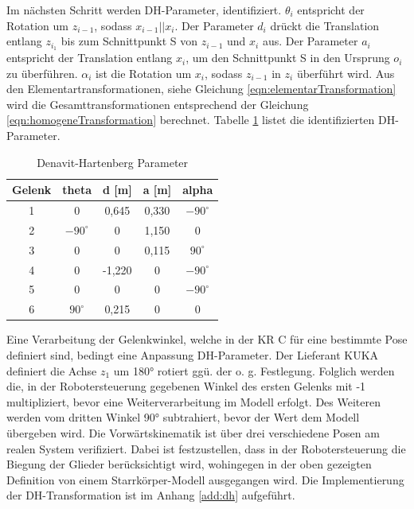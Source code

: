 %
Im nächsten Schritt werden DH-Parameter, identifiziert.  $\theta_i$ entspricht der Rotation um $z_{i-1}$, sodass $x_{i-1}||x_i$. Der Parameter $d_i$ drückt die Translation entlang $z_{i_1}$ bis zum Schnittpunkt S von $z_{i-1}$ und $x_i$ aus. Der Parameter $a_i$ entspricht der Translation entlang $x_i$, um den Schnittpunkt S in den Ursprung $o_i$ zu überführen. $\alpha_i$ ist die Rotation um $x_i$, sodass $z_{i-1}$ in $z_i$ überführt wird. Aus den Elementartransformationen, siehe Gleichung \ref{eqn:elementarTransformation} wird die Gesamttransformationen entsprechend der Gleichung \ref{eqn:homogeneTransformation} berechnet. Tabelle \ref{tab:dh} listet die identifizierten DH-Parameter. 
%
\begin{table}[tbph]
	\centering
	\begin{tabular}{|c|c|c|c|c|}
		\hline
		Gelenk & theta & d [m] & a [m] & alpha \\
		\hline
		1& 0 & 0,645 & 0,330 & $-90^\circ$ \\
		\hline
		2& $-90^\circ$ & 0 & 1,150 & 0 \\
		\hline
		3& 0 & 0 & 0,115 & $90^\circ$ \\
		\hline
		4& 0 & -1,220 & 0 & $-90^\circ$ \\
		\hline
		5& 0 & 0 & 0 & $-90^\circ$ \\
		\hline
		6& $90^\circ$ & 0,215 & 0 & 0 \\
		\hline
	\end{tabular}
\caption{Denavit-Hartenberg Parameter}
\label{tab:dh}
\end{table}
%
Eine Verarbeitung der Gelenkwinkel, welche in der KR C für eine bestimmte Pose definiert sind, bedingt eine Anpassung DH-Parameter. Der Lieferant KUKA definiert die Achse $z_{1}$ um 180° rotiert ggü. der o. g. Festlegung. Folglich werden die, in der Robotersteuerung gegebenen Winkel des ersten Gelenks  mit -1 multipliziert, bevor eine Weiterverarbeitung im Modell erfolgt. Des Weiteren werden vom dritten Winkel 90° subtrahiert, bevor der Wert dem Modell übergeben wird. Die Vorwärtskinematik ist über drei verschiedene Posen am realen System verifiziert. Dabei ist festzustellen, dass in der Robotersteuerung die Biegung der Glieder berücksichtigt wird, wohingegen in der oben gezeigten Definition von einem Starrkörper-Modell ausgegangen wird. 
Die Implementierung der DH-Transformation ist im Anhang \ref{add:dh}  aufgeführt. 
%
